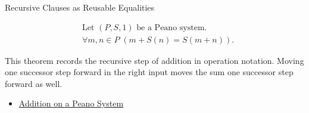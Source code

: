 \begin{topicbox}{Recursive Clauses as Reusable Equalities}
\begin{remark*}
\[
\begin{aligned}
&\text{Let } (P,S,1) \text{ be a Peano system.}\\
&\forall m,n \in P\;(m+S(n)=S(m+n)).
\end{aligned}
\]
\end{remark*}

\begin{remark*}[Interpretation]
This theorem records the recursive step of addition in operation notation.
Moving one successor step forward in the right input moves the sum one
successor step forward as well.
\end{remark*}

\begin{dependencies}
\begin{itemize}
  \item \hyperref[def:addition-on-peano-system]{Addition on a Peano System}
\end{itemize}
\end{dependencies}
\end{topicbox}

